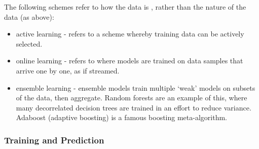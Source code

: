 \documentclass[11pt]{amsart}
\begin{document}
The following schemes refer to how the data is , rather than the nature of the data (as above):

\begin{itemize}
\item active learning - refers to a scheme whereby training data can be actively selected.
\item online learning - refers to where models are trained on data samples that arrive one by one, as if streamed.
\item ensemble learning - ensemble models train multiple `weak' models on subsets of the data, then aggregate. Random forests are an example of this, where many decorrelated decision trees are trained in an effort to reduce variance. Adaboost (adaptive boosting) is a famous boosting  meta-algorithm.
\end{itemize}

\subsubsection{Training and Prediction}
\end{document}
